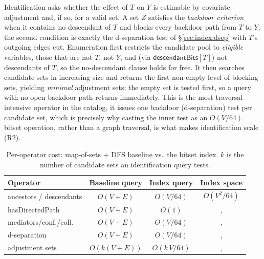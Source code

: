 Identification asks whether the effect of $T$ on $Y$ is estimable by covariate
adjustment and, if so, for a valid set. A set $Z$ satisfies the \emph{backdoor
criterion} when it contains no descendant of $T$ and blocks every backdoor path
from $T$ to $Y$; the second condition is exactly the d-separation test of
\S\ref{sec:index:dsep} with $T$'s outgoing edges cut. Enumeration first restricts
the candidate pool to \emph{eligible} variables, those that are not $T$, not $Y$,
and (via $\textsf{descendantBits}[T]$) not descendants of $T$, so the
no-descendant clause holds for free. It then searches candidate sets in
increasing size and returns the first non-empty level of blocking sets, yielding
\emph{minimal} adjustment sets; the empty set is tested first, so a query with no
open backdoor path returns immediately. This is the most traversal-intensive
operator in the catalog, it issues one backdoor (d-separation) test per
candidate set, which is precisely why casting the inner test as an $O(V/64)$
bitset operation, rather than a graph traversal, is what makes identification
scale (R2).

\begin{table}[t]\centering
\caption{Per-operator cost: map-of-sets $+$ DFS baseline vs.\ the bitset index.
$k$ is the number of candidate sets an identification query tests.}
\label{tab:complexity}
\begin{tabular}{@{}lccc@{}}
\toprule
Operator & Baseline query & Index query & Index space \\
\midrule
ancestors / descendants & $O(V{+}E)$ & $O(V/64)$ & $O(V^2/64)$ \\
hasDirectedPath         & $O(V{+}E)$ & $O(1)$     & ,  \\
mediators/conf./coll.   & $O(V{+}E)$ & $O(V/64)$  & ,  \\
d-separation            & $O(V{+}E)$ & $O(V/64)$  & ,  \\
adjustment sets         & $O(k(V{+}E))$ & $O(k\,V/64)$ & ,  \\
\bottomrule
\end{tabular}
\end{table}

